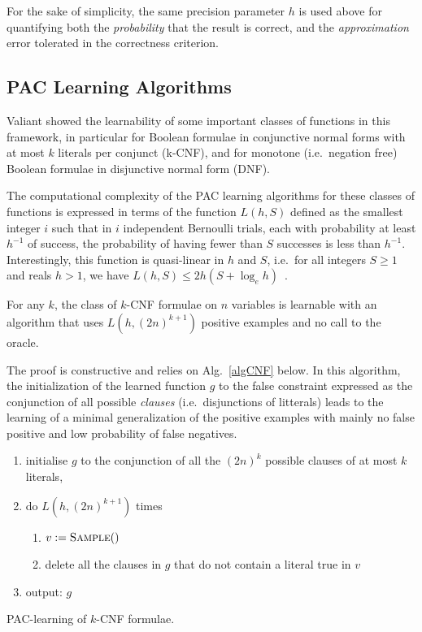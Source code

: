 \documentclass{llncs}
\begin{document}
For the sake of simplicity, the same precision parameter $h$ is used above for quantifying both the \emph{probability} that the result is correct,
and the \emph{approximation} error tolerated in the correctness criterion.


\subsection{PAC Learning Algorithms}

Valiant showed the learnability of some important classes of functions in this framework,
in particular for Boolean formulae in conjunctive normal forms with at most $k$ literals per conjunct (k-CNF),
and for monotone (i.e.~negation free) Boolean formulae in disjunctive normal form (DNF).

The computational complexity of the PAC learning algorithms for these classes of functions is expressed in terms of the function
$L(h,S)$ defined as the smallest integer $i$ such that
in $i$ independent Bernoulli trials, each with probability at least $h^{-1}$ of success, the probability of having fewer than $S$ successes is less than $h^{-1}$.
Interestingly, this function is quasi-linear in $h$ and $S$, i.e.~for all
integers $S\ge 1$ and reals $h>1$, we have $L(h,S) \le 2h(S+\log_e h)$~\cite{Valiant84cacm}.

\begin{theorem}\label{thm:kcnf}
For any $k$, the class of $k$-CNF formulae on $n$ variables is learnable with an
algorithm that uses $L(h,{(2 n)}^{k+1})$ positive examples and no call to the
oracle.
\end{theorem}

The proof is constructive and relies on Alg.~\ref{algCNF} below. In this algorithm, the initialization of the learned function $g$ to the false constraint expressed as the conjunction of all possible \emph{clauses} (i.e.~disjunctions of litterals)
leads to the learning of a minimal generalization of the positive examples with mainly no false positive and low probability of false negatives.

\begin{algorithm}
\begin{enumerate}
  \item initialise $g$ to the conjunction of all the $(2n)^k$ possible clauses of at most $k$ literals,
\item do $L(h,(2n)^{k+1})$ times 
\begin{enumerate}
\item $v:=\textsc{Sample}()$
\item delete all the clauses in $g$ that do not contain a literal true in $v$
\end{enumerate}
\item output: $g$
\end{enumerate}
\caption{PAC-learning of $k$-CNF formulae.\label{algCNF}}
\end{algorithm}
\end{document}
